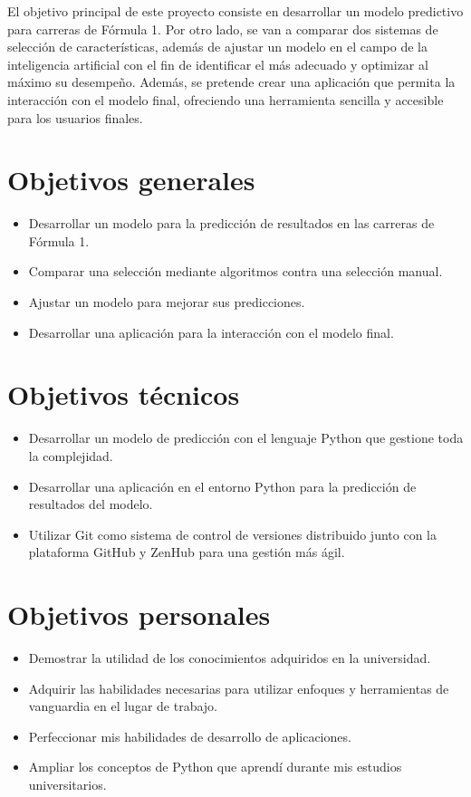 
El objetivo principal de este proyecto consiste en desarrollar un modelo predictivo para carreras de Fórmula 1. Por otro lado, se van a comparar dos sistemas de selección de características, además de ajustar un modelo en el campo de la inteligencia artificial con el fin de identificar el más adecuado y optimizar al máximo su desempeño. Además, se pretende crear una aplicación que permita la interacción con el modelo final, ofreciendo una herramienta sencilla y accesible para los usuarios finales.

\section{Objetivos generales}\label{objetivos-generales}

\begin{itemize}
\tightlist
\item
  Desarrollar un modelo para la predicción de resultados en las carreras de Fórmula 1.
\item
  Comparar una selección mediante algoritmos contra una selección manual.
\item
  Ajustar un modelo para mejorar sus predicciones.
\item
  Desarrollar una aplicación para la interacción con el modelo final.
\end{itemize}

\section{Objetivos técnicos}\label{objetivos-tecnicos}

\begin{itemize}
\tightlist
\item
  Desarrollar un modelo de predicción con el lenguaje Python que gestione toda la complejidad.
\item
  Desarrollar una aplicación en el entorno Python para la predicción de resultados del modelo.
\item
  Utilizar Git como sistema de control de versiones distribuido junto con la plataforma GitHub y ZenHub para una gestión más ágil.
\end{itemize}

\section{Objetivos personales}\label{objetivos-personales}

\begin{itemize}
\tightlist
\item
  Demostrar la utilidad de los conocimientos adquiridos en la universidad.
\item
  Adquirir las habilidades necesarias para utilizar enfoques y herramientas de vanguardia en el lugar de trabajo.
\item
  Perfeccionar mis habilidades de desarrollo de aplicaciones.
\item
  Ampliar los conceptos de Python que aprendí durante mis estudios universitarios.
\end{itemize}

